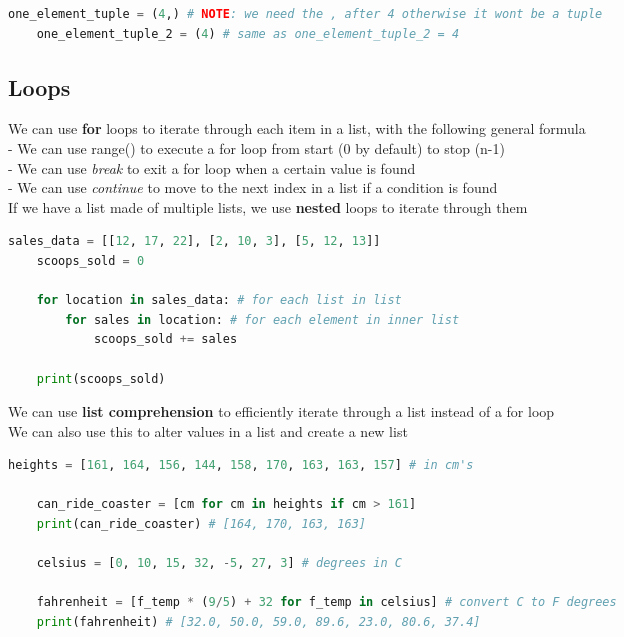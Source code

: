 \documentclass[11pt, a4paper]{article}
\begin{document}
\begin{spacing}{1.1}
\begin{lstlisting}[language=Python]
	one_element_tuple = (4,) # NOTE: we need the , after 4 otherwise it wont be a tuple
	one_element_tuple_2 = (4) # same as one_element_tuple_2 = 4	 \end{lstlisting} \newpage
	
	\subsection{Loops}
	We can use \textbf{for} loops to iterate through each item in a list, with the following general formula \\
	\hspace*{3mm} - We can use range() to execute a for loop from start (0 by default) to stop (n-1) \\
	\hspace*{3mm} - We can use \textit{break} to exit a for loop when a certain value is found \\
	\hspace*{3mm} - We can use \textit{continue} to move to the next index in a list if a condition is found \\
	If we have a list made of multiple lists, we use \textbf{nested} loops to iterate through them
	\begin{lstlisting}[language=Python]
	sales_data = [[12, 17, 22], [2, 10, 3], [5, 12, 13]]
	scoops_sold = 0
	
	for location in sales_data: # for each list in list
		for sales in location: # for each element in inner list
			scoops_sold += sales
	
	print(scoops_sold) \end{lstlisting}\vspace*{1mm}
	We can use \textbf{list comprehension} to efficiently iterate through a list instead of a for loop \\
	We can also use this to alter values in a list and create a new list
	\begin{lstlisting}[language=Python]
	heights = [161, 164, 156, 144, 158, 170, 163, 163, 157] # in cm's
	
	can_ride_coaster = [cm for cm in heights if cm > 161]
	print(can_ride_coaster) # [164, 170, 163, 163] 
	
	celsius = [0, 10, 15, 32, -5, 27, 3] # degrees in C
	
	fahrenheit = [f_temp * (9/5) + 32 for f_temp in celsius] # convert C to F degrees
	print(fahrenheit) # [32.0, 50.0, 59.0, 89.6, 23.0, 80.6, 37.4] \end{lstlisting}\vspace*{4mm}
	

\end{spacing}
\end{document}
